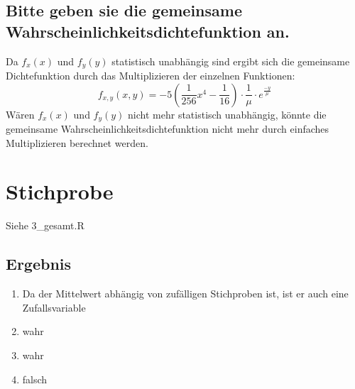 \documentclass[12pt, a4paper, titlepage]{article}
\begin{document}
	\subsection{Bitte geben sie die gemeinsame Wahrscheinlichkeitsdichtefunktion an.}
	Da $f_x (x)$ und $f_y (y)$ statistisch unabh\"angig sind ergibt sich die gemeinsame Dichtefunktion durch das Multiplizieren der einzelnen Funktionen:
	$$f_{x,y}(x,y)= -5(\frac{1}{256} x^4 - \frac{1}{16}) \cdot \frac{1}{\mu}\cdot e^{\frac{-y}{\mu}}$$
	W\"aren $f_x (x)$ und $f_y (y)$ nicht mehr statistisch unabh\"angig, könnte die gemeinsame Wahrscheinlichkeitsdichtefunktion nicht mehr durch einfaches Multiplizieren berechnet werden.
	
	\section{Stichprobe}
	Siehe 3\_gesamt.R
	\subsection{Ergebnis}
	\begin{enumerate}
		\item Da der Mittelwert abh\"angig von zuf\"alligen Stichproben ist, ist er auch eine Zufallsvariable
		\item wahr
		\item wahr
		\item falsch
	\end{enumerate}
	
\end{document}
